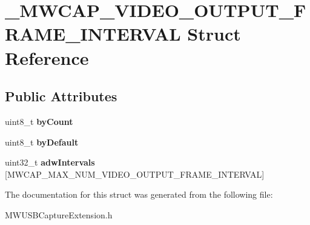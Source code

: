\hypertarget{struct__MWCAP__VIDEO__OUTPUT__FRAME__INTERVAL}{\section{\-\_\-\-M\-W\-C\-A\-P\-\_\-\-V\-I\-D\-E\-O\-\_\-\-O\-U\-T\-P\-U\-T\-\_\-\-F\-R\-A\-M\-E\-\_\-\-I\-N\-T\-E\-R\-V\-A\-L Struct Reference}
\label{struct__MWCAP__VIDEO__OUTPUT__FRAME__INTERVAL}
}
\subsection*{Public Attributes}
\begin{DoxyCompactItemize}
\item 
\hypertarget{struct__MWCAP__VIDEO__OUTPUT__FRAME__INTERVAL_ad5a5957b7ce495010e8214b93cbc040d}{uint8\-\_\-t {\bfseries by\-Count}}\label{struct__MWCAP__VIDEO__OUTPUT__FRAME__INTERVAL_ad5a5957b7ce495010e8214b93cbc040d}

\item 
\hypertarget{struct__MWCAP__VIDEO__OUTPUT__FRAME__INTERVAL_af28c2abf9e08f48ca27aa35031e362c1}{uint8\-\_\-t {\bfseries by\-Default}}\label{struct__MWCAP__VIDEO__OUTPUT__FRAME__INTERVAL_af28c2abf9e08f48ca27aa35031e362c1}

\item 
\hypertarget{struct__MWCAP__VIDEO__OUTPUT__FRAME__INTERVAL_a72f1fcc831741a832f8f66e1d5e9b6af}{uint32\-\_\-t {\bfseries adw\-Intervals} \mbox{[}M\-W\-C\-A\-P\-\_\-\-M\-A\-X\-\_\-\-N\-U\-M\-\_\-\-V\-I\-D\-E\-O\-\_\-\-O\-U\-T\-P\-U\-T\-\_\-\-F\-R\-A\-M\-E\-\_\-\-I\-N\-T\-E\-R\-V\-A\-L\mbox{]}}\label{struct__MWCAP__VIDEO__OUTPUT__FRAME__INTERVAL_a72f1fcc831741a832f8f66e1d5e9b6af}

\end{DoxyCompactItemize}


The documentation for this struct was generated from the following file\-:\begin{DoxyCompactItemize}
\item 
M\-W\-U\-S\-B\-Capture\-Extension.\-h\end{DoxyCompactItemize}
